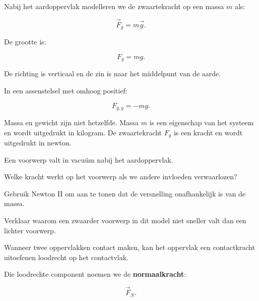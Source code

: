 \documentclass{ximera}
\begin{document}

Nabij het aardoppervlak modelleren we de zwaartekracht op een massa $m$
als:

\[
\boxed{
\vec F_g=m\vec g.
}
\]

De grootte is:

\[
\boxed{
F_g=mg.
}
\]

De richting is verticaal en de zin is naar het middelpunt van de aarde.

In een assenstelsel met omhoog positief:

\[
F_{g,y}=-mg.
\]

\begin{opmerking}
Massa en gewicht zijn niet hetzelfde. Massa $m$ is een eigenschap van
het systeem en wordt uitgedrukt in kilogram. De zwaartekracht $F_g$ is
een kracht en wordt uitgedrukt in newton.
\end{opmerking}


\begin{oefening}{\oefU\ESS}

Een voorwerp valt in vacuüm nabij het aardoppervlak.

\begin{question}
Welke kracht werkt op het voorwerp als we andere invloeden
verwaarlozen?
\end{question}

\begin{question}
Gebruik Newton II om aan te tonen dat de versnelling onafhankelijk is
van de massa.
\end{question}

\begin{question}
Verklaar waarom een zwaarder voorwerp in dit model niet sneller valt
dan een lichter voorwerp.
\end{question}

\end{oefening}




Wanneer twee oppervlakken contact maken, kan het oppervlak een
contactkracht uitoefenen loodrecht op het contactvlak.

Die loodrechte component noemen we de \textbf{normaalkracht}:

\[
\vec F_N.
\]
\end{document}
